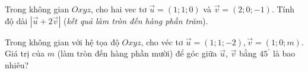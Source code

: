 \begin{bt}%
	Trong không gian $Oxyz$, cho hai vec tơ $\overrightarrow{u}=(1;1;0)$ và  $\overrightarrow{v}=(2;0;-1)$. Tính độ dài $\left|\overrightarrow{u}+2 \overrightarrow{v}\right|$ (\textit{kết quả làm tròn đến hàng phần trăm}).
\end{bt}

\begin{bt}%
	Trong  không gian với hệ tọa độ $Oxyz$, cho véc tơ $\overrightarrow{u}=(1;1;-2),\overrightarrow{v}=(1;0;m)$. Giá trị của $m$ (làm tròn đến hàng phần mười) để góc giữa $\overrightarrow{u}$, $\overrightarrow{v}$ bằng $45^{^\circ}$ là bao nhiêu?
\end{bt}

